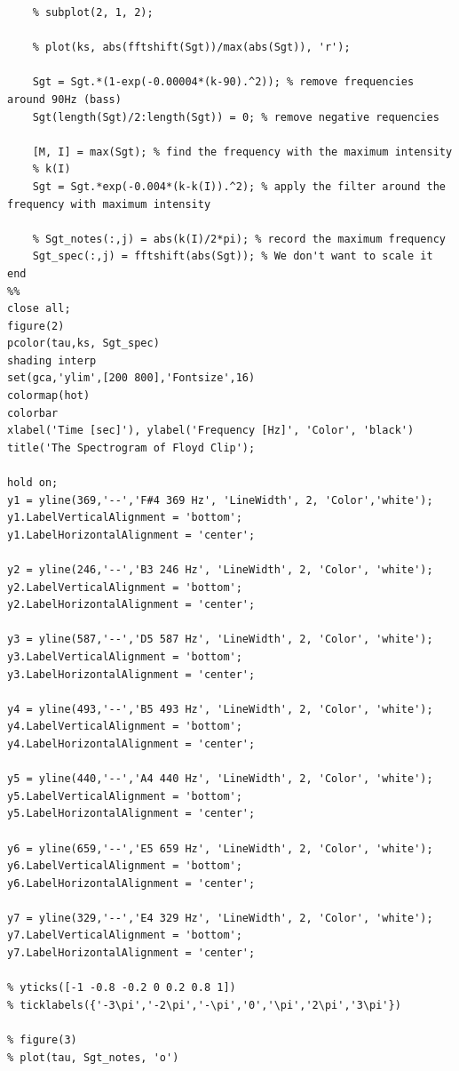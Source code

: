 \documentclass{article}
\begin{document}
\begin{appendices}
\begin{verbatim}
    % subplot(2, 1, 2);

    % plot(ks, abs(fftshift(Sgt))/max(abs(Sgt)), 'r');
        
    Sgt = Sgt.*(1-exp(-0.00004*(k-90).^2)); % remove frequencies around 90Hz (bass)
    Sgt(length(Sgt)/2:length(Sgt)) = 0; % remove negative requencies

    [M, I] = max(Sgt); % find the frequency with the maximum intensity
    % k(I)
    Sgt = Sgt.*exp(-0.004*(k-k(I)).^2); % apply the filter around the frequency with maximum intensity

    % Sgt_notes(:,j) = abs(k(I)/2*pi); % record the maximum frequency
    Sgt_spec(:,j) = fftshift(abs(Sgt)); % We don't want to scale it
end
%% 
close all;
figure(2)
pcolor(tau,ks, Sgt_spec)
shading interp
set(gca,'ylim',[200 800],'Fontsize',16)
colormap(hot)
colorbar
xlabel('Time [sec]'), ylabel('Frequency [Hz]', 'Color', 'black')
title('The Spectrogram of Floyd Clip');

hold on;
y1 = yline(369,'--','F#4 369 Hz', 'LineWidth', 2, 'Color','white');
y1.LabelVerticalAlignment = 'bottom';
y1.LabelHorizontalAlignment = 'center';

y2 = yline(246,'--','B3 246 Hz', 'LineWidth', 2, 'Color', 'white');
y2.LabelVerticalAlignment = 'bottom';
y2.LabelHorizontalAlignment = 'center'; 

y3 = yline(587,'--','D5 587 Hz', 'LineWidth', 2, 'Color', 'white');
y3.LabelVerticalAlignment = 'bottom';
y3.LabelHorizontalAlignment = 'center';

y4 = yline(493,'--','B5 493 Hz', 'LineWidth', 2, 'Color', 'white');
y4.LabelVerticalAlignment = 'bottom';
y4.LabelHorizontalAlignment = 'center';

y5 = yline(440,'--','A4 440 Hz', 'LineWidth', 2, 'Color', 'white');
y5.LabelVerticalAlignment = 'bottom';
y5.LabelHorizontalAlignment = 'center';

y6 = yline(659,'--','E5 659 Hz', 'LineWidth', 2, 'Color', 'white');
y6.LabelVerticalAlignment = 'bottom';
y6.LabelHorizontalAlignment = 'center';

y7 = yline(329,'--','E4 329 Hz', 'LineWidth', 2, 'Color', 'white');
y7.LabelVerticalAlignment = 'bottom';
y7.LabelHorizontalAlignment = 'center';

% yticks([-1 -0.8 -0.2 0 0.2 0.8 1])
% ticklabels({'-3\pi','-2\pi','-\pi','0','\pi','2\pi','3\pi'})

% figure(3)
% plot(tau, Sgt_notes, 'o')
\end{verbatim}


\end{appendices}
\end{document}
